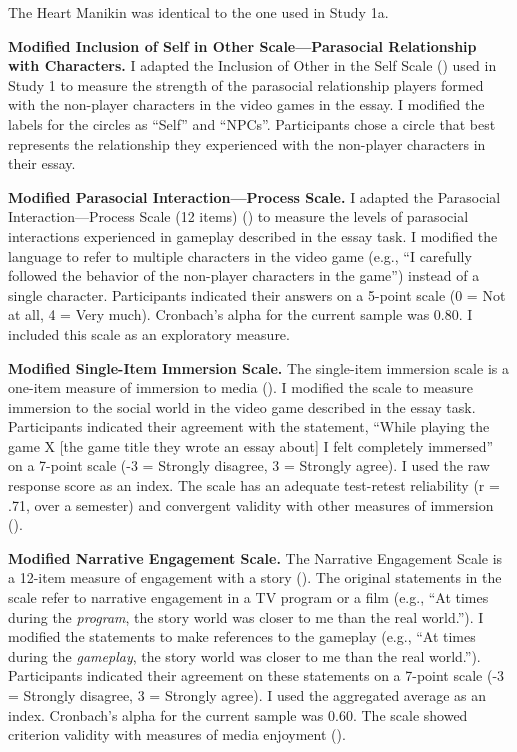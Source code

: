 \documentclass[
]{udthesis}
\begin{document}
The Heart Manikin was identical to the one used in Study 1a.

\textbf{Modified Inclusion of Self in Other Scale---Parasocial Relationship with Characters.} I adapted the Inclusion of Other in the Self Scale () used in Study 1 to measure the strength of the parasocial relationship players formed with the non-player characters in the video games in the essay. I modified the labels for the circles as ``Self'' and ``NPCs''. Participants chose a circle that best represents the relationship they experienced with the non-player characters in their essay.

\textbf{Modified Parasocial Interaction---Process Scale.} I adapted the Parasocial Interaction---Process Scale (12 items) () to measure the levels of parasocial interactions experienced in gameplay described in the essay task. I modified the language to refer to multiple characters in the video game (e.g., ``I carefully followed the behavior of the non-player characters in the game'') instead of a single character. Participants indicated their answers on a 5-point scale (0 = Not at all, 4 = Very much). Cronbach's alpha for the current sample was 0.80. I included this scale as an exploratory measure.

\textbf{Modified Single-Item Immersion Scale.} The single-item immersion scale is a one-item measure of immersion to media (). I modified the scale to measure immersion to the social world in the video game described in the essay task. Participants indicated their agreement with the statement, ``While playing the game X {[}the game title they wrote an essay about{]} I felt completely immersed'' on a 7-point scale (-3 = Strongly disagree, 3 = Strongly agree). I used the raw response score as an index. The scale has an adequate test-retest reliability (r = .71, over a semester) and convergent validity with other measures of immersion ().

\textbf{Modified Narrative Engagement Scale.} The Narrative Engagement Scale is a 12-item measure of engagement with a story (). The original statements in the scale refer to narrative engagement in a TV program or a film (e.g., ``At times during the \emph{program}, the story world was closer to me than the real world.''). I modified the statements to make references to the gameplay (e.g., ``At times during the \emph{gameplay}, the story world was closer to me than the real world.''). Participants indicated their agreement on these statements on a 7-point scale (-3 = Strongly disagree, 3 = Strongly agree). I used the aggregated average as an index. Cronbach's alpha for the current sample was 0.60. The scale showed criterion validity with measures of media enjoyment ().
\end{document}
